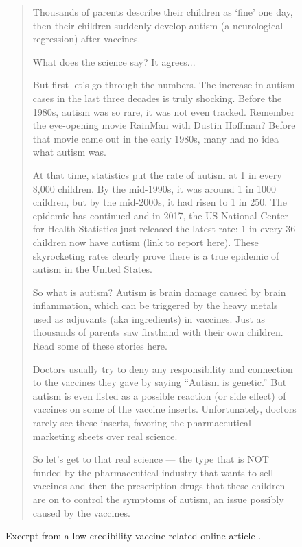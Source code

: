 \documentclass[a4paper,twoside,phd]{BYUPhys}
\begin{document}
\begin{figure}
	\begin{framed}
	\begin{quotation}
		Thousands of parents describe their children as ‘fine’ one day, then their children suddenly develop autism (a neurological regression) after vaccines.\newline
		
		What does the science say? It agrees... \newline
				
		But first let’s go through the numbers. The increase in autism cases in the last three decades is truly shocking. Before the 1980s, autism was so rare, it was not even tracked. Remember the eye-opening movie RainMan with Dustin Hoffman? Before that movie came out in the early 1980s, many had no idea what autism was.\newline
		
		At that time, statistics put the rate of autism at 1 in every 8,000 children. By the mid-1990s, it was around 1 in 1000 children, but by the mid-2000s, it had risen to 1 in 250. The epidemic has continued and in 2017, the US National Center for Health Statistics just released the latest rate: 1 in every 36 children now have autism (link to report here). These skyrocketing rates clearly prove there is a true epidemic of autism in the United States.\newline
		
		So what is autism? Autism is brain damage caused by brain inflammation, which can be triggered by the heavy metals used as adjuvants (aka ingredients) in vaccines. Just as thousands of parents saw firsthand with their own children. Read some of these stories here.\newline
		
		Doctors usually try to deny any responsibility and connection to the vaccines they gave by saying “Autism is genetic.” But autism is even listed as a possible reaction (or side effect) of vaccines on some of the vaccine inserts. Unfortunately, doctors rarely see these inserts, favoring the pharmaceutical marketing sheets over real science.\newline
		
		So let’s get to that real science — the type that is NOT funded by the pharmaceutical industry that wants to sell vaccines and then the prescription drugs that these children are on to control the symptoms of autism, an issue possibly caused by the vaccines.\newline
		
		
	\end{quotation}
	\end{framed}
	\caption{Excerpt from a low credibility vaccine-related online article \cite{AutismVaccine}.}
	\label{fig:ArticleExample}
\end{figure}
\end{document}
